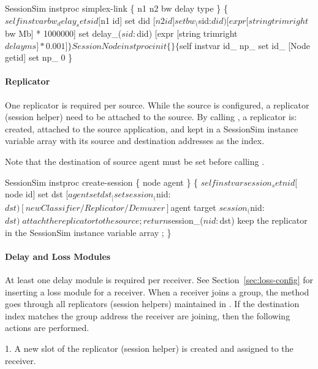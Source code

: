 \begin{program}
SessionSim instproc simplex-link \{ n1 n2 bw delay type \} \{
    $self instvar bw_ delay_
    set sid [$n1 id]
    set did [$n2 id]

    set bw_($sid:$did) [expr [string trimright $bw Mb] * 1000000]
    set delay_($sid:$did) [expr [string trimright $delay ms] * 0.001]
\}

SessionNode instproc init \{\} \{
    $self instvar id_ np_
    set id_ [Node getid]
    set np_ 0
\}
\end{program}

\paragraph{Replicator}
One replicator is required per source.  While the source is configured,
a replicator (session helper) need to be attached to the source.  By
calling , a replicator is:
created,
attached to the source application, and 
kept in a SessionSim instance variable  array with 
its source and destination addresses as the index.

Note that the destination of source agent must be set before
calling .

\begin{program}
SessionSim instproc create-session \{ node agent \} \{
    $self instvar session_

    set nid [$node id]
    set dst [$agent set dst_]
    set session_($nid:$dst) [new Classifier/Replicator/Demuxer]
    $agent target $session_($nid:$dst) \; attach the replicator to the source;
    return $session_($nid:$dst) \; keep the replicator in the SessionSim instance variable array ;
\}
\end{program}

\paragraph{Delay and Loss Modules}

At least one delay module is required per receiver.
See Section~\ref{sec:loss-config} for inserting a loss module for a receiver.
When a receiver joins a group, 
the  method goes through
all replicators (session helpers) maintained in .
If the destination index matches the group address
the receiver are joining, then the following actions are performed.

1. A new slot of the replicator (session helper) is created and assigned to the receiver.

